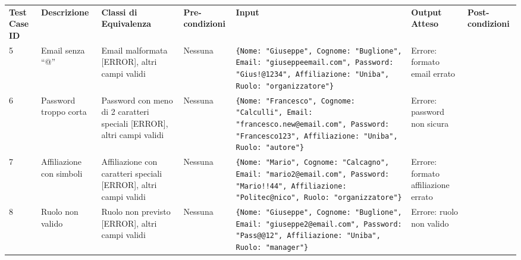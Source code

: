 \begin{sidewaystable}
\begin{tabular}{|p{3cm}|p{2cm}|p{2cm}|p{2cm}|p{4cm}|p{2cm}|p{2cm}|}
\hline
\rowcolor{SkyBlue}
\multicolumn{7}{l}{\textbf{Test Suite: Registrazione 2}}\\
\hline
\rowcolor{Red}
\textbf{Test Case ID} & \textbf{Descrizione} & \textbf{Classi di Equivalenza} & \textbf{Pre-condizioni} & \textbf{Input} & \textbf{Output Atteso} & \textbf{Post-condizioni} \\
\hline
5 & Email senza “@” & Email malformata [ERROR], altri campi validi & Nessuna & \texttt{\{Nome: "Giuseppe", Cognome: "Buglione", Email: "giuseppeemail.com", Password: "Gius!@1234", Affiliazione: "Uniba", Ruolo: "organizzatore"\}} & Errore: formato email errato & \\
\hline
6 & Password troppo corta & Password con meno di 2 caratteri speciali [ERROR], altri campi validi & Nessuna & \texttt{\{Nome: "Francesco", Cognome: "Calculli", Email: "francesco.new@email.com", Password: "Francesco123", Affiliazione: "Uniba", Ruolo: "autore"\}} & Errore: password non sicura & \\
\hline
7 & Affiliazione con simboli & Affiliazione con caratteri speciali [ERROR], altri campi validi & Nessuna & \texttt{\{Nome: "Mario", Cognome: "Calcagno", Email: "mario2@email.com", Password: "Mario!!44", Affiliazione: "Politec@nico", Ruolo: "organizzatore"\}} & Errore: formato affiliazione errato & \\
\hline
8 & Ruolo non valido & Ruolo non previsto [ERROR], altri campi validi & Nessuna & \texttt{\{Nome: "Giuseppe", Cognome: "Buglione", Email: "giuseppe2@email.com", Password: "Pass@@12", Affiliazione: "Uniba", Ruolo: "manager"\}} & Errore: ruolo non valido & \\
\hline
\end{tabular}
\end{sidewaystable}

